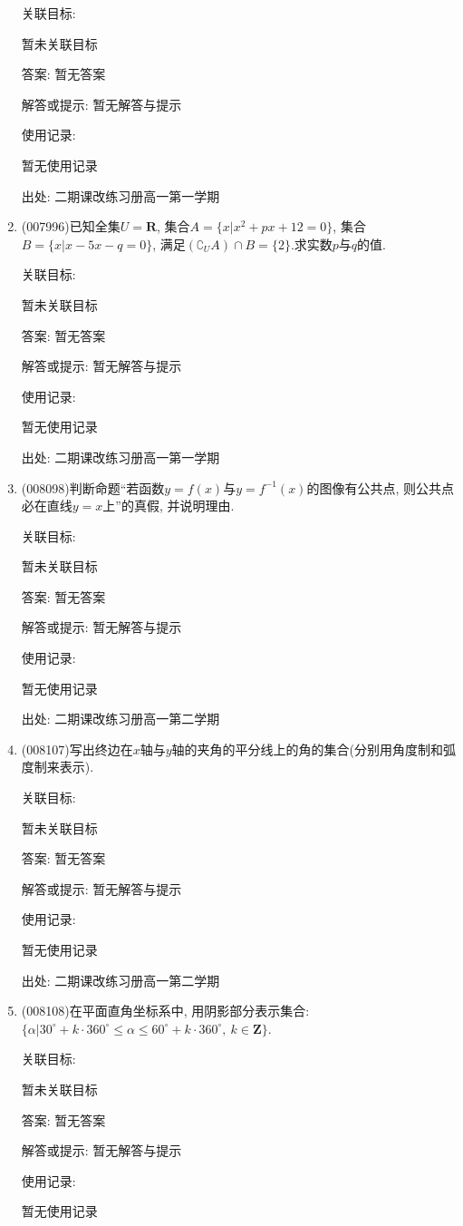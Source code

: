\documentclass[10pt,a4paper]{article}
\begin{document}
\begin{enumerate}[1.]
关联目标:

暂未关联目标

答案: 暂无答案

解答或提示: 暂无解答与提示

使用记录:

暂无使用记录


出处: 二期课改练习册高一第一学期
\item { (007996)}已知全集$U=\mathbf{R}$, 集合$A=\{x|x^2+px+12=0\}$, 集合$B=\{x|x-5x-q=0\}$, 满足$(\complement _UA)\cap B=\{2\}$.求实数$p$与$q$的值.


关联目标:

暂未关联目标

答案: 暂无答案

解答或提示: 暂无解答与提示

使用记录:

暂无使用记录


出处: 二期课改练习册高一第一学期
\item { (008098)}判断命题``若函数$y=f(x)$与$y=f^{-1}(x)$的图像有公共点, 则公共点必在直线$y=x$上''的真假, 并说明理由.


关联目标:

暂未关联目标

答案: 暂无答案

解答或提示: 暂无解答与提示

使用记录:

暂无使用记录


出处: 二期课改练习册高一第二学期
\item { (008107)}写出终边在$x$轴与$y$轴的夹角的平分线上的角的集合(分别用角度制和弧度制来表示).


关联目标:

暂未关联目标

答案: 暂无答案

解答或提示: 暂无解答与提示

使用记录:

暂无使用记录


出处: 二期课改练习册高一第二学期
\item { (008108)}在平面直角坐标系中, 用阴影部分表示集合: $\{\alpha|30^\circ+k\cdot 360^\circ\le \alpha \le 60^\circ+k\cdot 360^\circ, \ k\in \mathbf{Z}\}$.


关联目标:

暂未关联目标

答案: 暂无答案

解答或提示: 暂无解答与提示

使用记录:

暂无使用记录



\end{enumerate}
\end{document}
